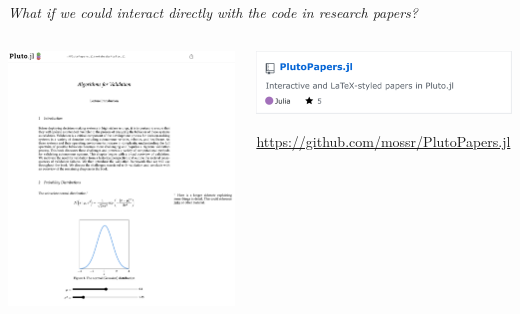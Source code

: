 \begin{frame}[fragile]{\normalfont{}} \pause

\centering
\textit{What if we could interact directly with the code in research papers?}

\end{frame}


\begin{frame}[fragile]{\normalfont{}}

\begin{columns}
  \hfill
  \begin{column}{0.35\textwidth}
    \centering
    \includegraphics[width=\linewidth]{media/plutopapers-tufte-light.png}

  \end{column}
  \pause
  \begin{column}{0.54\textwidth}
    \includegraphics[width=0.85\linewidth]{media/PlutoPapers.jl.png}

    \textcolor{repo}{\small \url{https://github.com/mossr/PlutoPapers.jl}}
  \end{column}
  \hfill
\end{columns}
    
\end{frame}